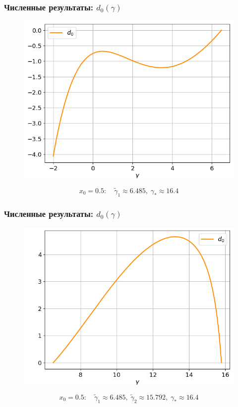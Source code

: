 \documentclass[fullscreen=true, unicode, bookmarks=false]{beamer}
\begin{document}
\begin{frame}
\frametitle{ Численные результаты: $ d_0(\gamma) $ }

\begin{figure} 
\includegraphics[scale=0.55]{divergent_d0_12_1.png}  
\end{figure}

$$ x_0 = 0.5: \quad \tilde{\gamma}_1 \approx 6.485, \; \gamma_* \approx 16.4 $$

\end{frame}

\begin{frame}
\frametitle{ Численные результаты: $ d_0(\gamma) $ }

\begin{figure} 
\includegraphics[scale=0.55]{divergent_d0_12_2.png}  
\end{figure}

$$ x_0 = 0.5: \quad \tilde{\gamma}_1 \approx 6.485, \; \tilde{\gamma}_2 \approx 15.792, \; \gamma_* \approx 16.4 $$

\end{frame}
\end{document}
